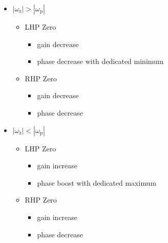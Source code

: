 \documentclass{article}[11pt]
\begin{document}
\begin{itemize}
  \item $\left|\omega_{\mathrm{z}}\right| > \left|\omega_{\mathrm{p}}\right|$
  \begin{itemize}
    \item[-] LHP Zero
    \begin{itemize}
      \item gain decrease
      \item phase decrease with dedicated minimum
    \end{itemize} 
    \item[-] RHP Zero
    \begin{itemize}
      \item gain decrease
      \item phase decrease
    \end{itemize} 
  \end{itemize}
  \item $\left|\omega_{\mathrm{z}}\right| < \left|\omega_{\mathrm{p}}\right|$
  \begin{itemize}
    \item[-] LHP Zero
    \begin{itemize}
      \item gain increase
      \item phase boost with dedicated maximum
    \end{itemize} 
    \item[-] RHP Zero
    \begin{itemize}
      \item gain increase
      \item phase decrease
    \end{itemize}
  \end{itemize}
\end{itemize}

\printbibliography
\end{document}
